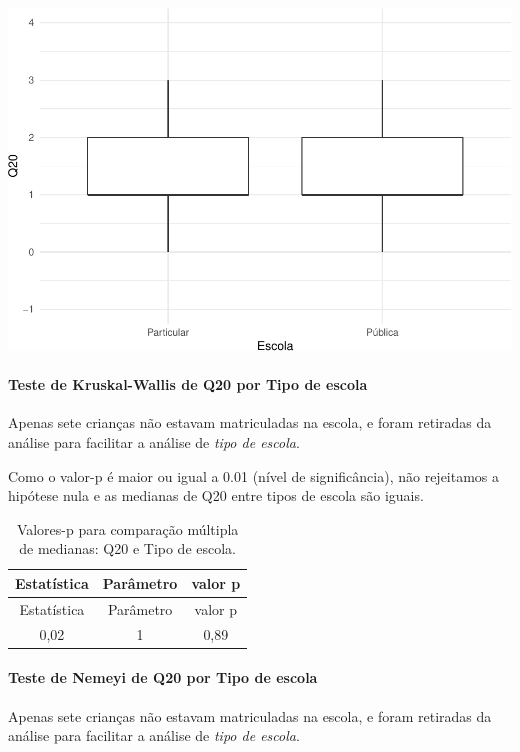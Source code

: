 \documentclass[]{article}
\let\oldparagraph\paragraph
\renewcommand{\paragraph}[1]{\oldparagraph{#1}\mbox{}}
\begin{document}
\begin{center}\includegraphics[width=0.75\linewidth]{relatorio_covid19_files/figure-latex/unnamed-chunk-411-1} \end{center}

\hypertarget{teste-de-kruskal-wallis-de-q20-por-tipo-de-escola}{%
\paragraph{Teste de Kruskal-Wallis de Q20 por Tipo de escola}\label{teste-de-kruskal-wallis-de-q20-por-tipo-de-escola}}

Apenas sete crianças não estavam matriculadas na escola, e foram retiradas da análise para facilitar a análise de \emph{tipo de escola}.

Como o valor-p é maior ou igual a 0.01 (nível de significância), não rejeitamos a hipótese nula e as medianas de Q20 entre tipos de escola são iguais.

\begin{longtable}[]{@{}ccc@{}}
\caption{\label{tab:unnamed-chunk-413}Valores-p para comparação múltipla de medianas: Q20 e Tipo de escola.}\tabularnewline
\toprule
Estatística & Parâmetro & valor p\tabularnewline
\midrule
\endfirsthead
\toprule
Estatística & Parâmetro & valor p\tabularnewline
\midrule
\endhead
0,02 & 1 & 0,89\tabularnewline
\bottomrule
\end{longtable}

\hypertarget{teste-de-nemeyi-de-q20-por-tipo-de-escola}{%
\paragraph{Teste de Nemeyi de Q20 por Tipo de escola}\label{teste-de-nemeyi-de-q20-por-tipo-de-escola}}

Apenas sete crianças não estavam matriculadas na escola, e foram retiradas da análise para facilitar a análise de \emph{tipo de escola}.
\end{document}
